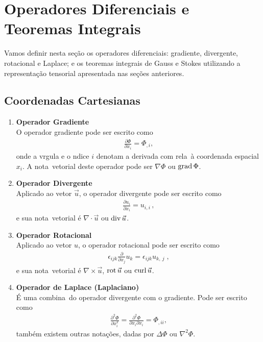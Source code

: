 \section{Operadores Diferenciais e Teoremas Integrais }

Vamos definir nesta se\c{c}\~ao os operadores diferenciais: gradiente,
divergente, rotacional e Laplace; e os teoremas integrais de Gauss e Stokes utilizando a
representa\c{c}\~ao tensorial apresentada nas se\c{c}\~oes anteriores.
\subsection {Coordenadas Cartesianas}

\begin{enumerate}

\item {\bf Operador Gradiente}\\
O operador gradiente pode ser escrito como
\begin{eqnarray}
\frac{\partial \Phi}{\partial x_{i}} = \Phi_{,i},
\end{eqnarray}
onde a v\ih rgula e o \ih ndice $i$ denotam a derivada com
rela\cao\ \`a coordenada espacial $x_{i}$. A nota\cao\ vetorial
deste operador pode ser $\nabla \Phi$ ou $\text{grad\thinspace}\Phi$.

\item {\bf Operador Divergente}\\
  Aplicado ao vetor $\vec{u}$, o operador divergente pode ser escrito
como
\begin{eqnarray}
\frac{\partial u_{i}}{\partial x_{i}} = u_{i,i} \, ,
\end{eqnarray}
e sua nota\cao\ vetorial \'e $\nabla\!\cdot\!\vec{u}$ ou $\text{div\thinspace}\vec{u}$.

\item {\bf Operador Rotacional}\\
Aplicado ao vetor $u$, o operador rotacional pode ser escrito
como
\begin{eqnarray}
\epsilon_{ijk}\frac{\partial }{\partial x_{j}}u_k =
\epsilon_{ijk}u_{k,\:j} \; ,
\end{eqnarray}
e sua nota\cao\ vetorial \'e $\nabla\!\times\!\vec{u}$, $\text{rot\thinspace}\vec{u}$ ou
    $\text{curl\thinspace}\vec{u}$.

\item {\bf Operador de Laplace (Laplaciano)}\\
\'E uma combina\cao\ do operador divergente com
o gradiente. Pode ser escrito como
\begin{eqnarray}
 \frac{\partial^{2}\Phi}{\partial x_{i}^2}= \frac{\partial^{2}\Phi}{\partial x_{i}\partial x_{i}} = \Phi_{,ii},
\end{eqnarray}
    tamb\'em existem outras nota\c{c}\~oes, dadas por $\Delta \Phi$ ou $\nabla^{2}\Phi$.
\\


\end{enumerate}
